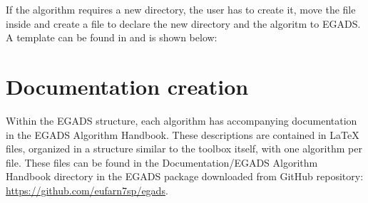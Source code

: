 \documentclass[a4paper,10pt,openany,english]{sphinxmanual}
\begin{document}
\begin{enumerate}
\begin{description}
If the algorithm requires a new directory, the user has to create it, move the file inside and create a  file to declare the new directory and the algoritm to EGADS. A template can be found in  and is shown below:

\begin{sphinxVerbatim}[commandchars=\\\{\}]

  
  
  

 
       
 
\end{sphinxVerbatim}

\end{description}

\end{enumerate}


\section{Documentation creation}
\label{alg_development:documentation-creation}
Within the EGADS structure, each algorithm has accompanying documentation in the EGADS Algorithm Handbook. These descriptions are contained in LaTeX files, organized in a structure similar to the toolbox itself, with one algorithm per file. These files can be found in the Documentation/EGADS Algorithm Handbook directory in the EGADS package downloaded from GitHub repository: \url{https://github.com/eufarn7sp/egads}.
\end{document}
